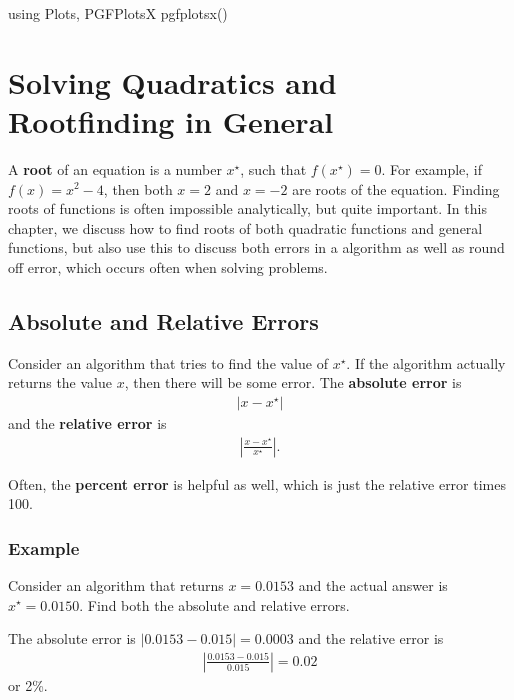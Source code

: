 
\begin{jlcode}[root]
using Plots, PGFPlotsX
pgfplotsx()
\end{jlcode}


\hypertarget{ch:rootfinding}{%
\chapter{Solving Quadratics and Rootfinding in General}\label{ch:rootfinding}}

A \textbf{root} of an equation is a number $x^{\star}$, such that $f(x^{\star})=0$.  For example, if $f(x)=x^2-4$, then both $x=2$ and $x=-2$ are roots of the equation.  Finding roots of functions is often impossible analytically, but quite important.  In this chapter, we discuss how to find roots of both quadratic functions and general functions, but also use this to discuss both errors in a algorithm as well as round off error, which occurs often when solving problems.  

\hypertarget{absolute-and-relative-errors}{%
\section{Absolute and Relative
Errors}\label{absolute-and-relative-errors}}

Consider an algorithm that tries to find the value of $x^{\star}$. If
the algorithm actually returns the value $x$, then there will be some
error. The \textbf{absolute error} is \begin{align*}|x - x^{\star}|\end{align*} and the
\textbf{relative error} is
\begin{align*}\left|\frac{x-x^{\star}}{x^{\star}}\right|.\end{align*}

Often, the \textbf{percent error} is helpful as well, which is just the
relative error times 100.


\subsection{Example}

Consider an algorithm that returns $x=0.0153$ and the actual answer is
$x^{\star}=0.0150$. Find both the absolute and relative errors.

The absolute error is $|0.0153-0.015|= 0.0003$ and the relative error
is \begin{align*} \left|\frac{0.0153-0.015}{0.015}\right|=0.02 \end{align*} or 2\%.

